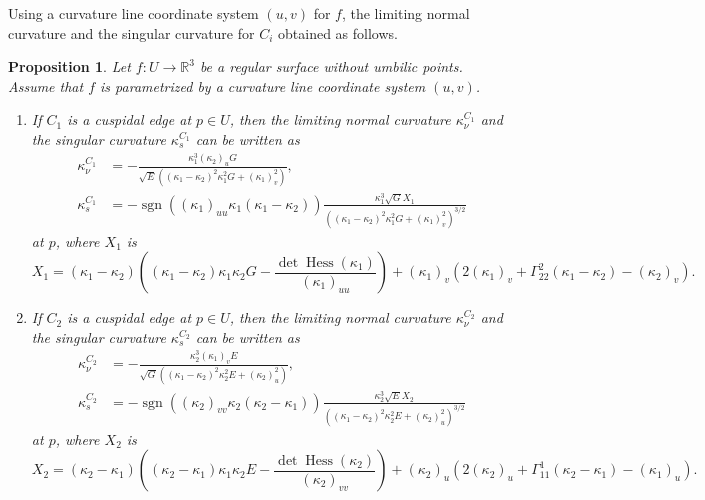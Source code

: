 \documentclass[11pt,a4paper,pdflatex,final]{amsart}
\theoremstyle{plain}
\newtheorem{proposition}[theorem]{Proposition}%
\theoremstyle{definition}
\theoremstyle{remark}
\newcommand{\hess}{\operatorname{Hess}}
\newcommand{\sgn}{\operatorname{sgn}}
\newcommand{\0}{\bm{0}}
\newcommand{\R}{\mathbb{R}}
\numberwithin{equation}{section}
\begin{document}
{
Using a curvature line coordinate system $(u,v)$ for $f$, 
the limiting normal curvature and the singular curvature for $C_i$ 
obtained as follows.
\begin{proposition}\label{prop:curvatures-C}
	Let $f\colon U\to\R^3$ be a regular surface without umbilic points. 
	Assume that $f$ is parametrized by a curvature line coordinate system $(u,v)$. 
	\begin{enumerate}[label={\rm(\arabic*)}]
		\item If $C_1$ is a cuspidal edge at $p\in U$, 
		then the limiting normal curvature $\kappa_\nu^{C_1}$ and 
		the singular curvature $\kappa_s^{C_1}$ can be written as 
		\begin{equation}\label{eq:kskn-C1}
			\begin{aligned}
				\kappa_\nu^{C_1}&=
				-\frac{\kappa_1^3(\kappa_2)_uG}
				{\sqrt{E}((\kappa_1-\kappa_2)^2\kappa_1^2G+(\kappa_1)_v^2)},\\
				\kappa_s^{C_1}&=
				-\sgn((\kappa_1)_{uu}\kappa_1(\kappa_1-\kappa_2))
				\frac{\kappa_1^3\sqrt{G}X_1}
				{((\kappa_1-\kappa_2)^2\kappa_1^2G+(\kappa_1)_v^2)^{3/2}}
			\end{aligned}
		\end{equation}
		at $p$, where $X_1$ is 
		\[
		X_1=(\kappa_1-\kappa_2)\left(
		(\kappa_1-\kappa_2)\kappa_1\kappa_2G-\frac{\det\hess(\kappa_1)}{(\kappa_1)_{uu}}\right)
		+(\kappa_1)_v(2(\kappa_1)_v+\Gamma^{2}_{22}(\kappa_1-\kappa_2)-(\kappa_2)_v).
		\]
		\item If $C_2$ is a cuspidal edge at $p\in U$, 
		then the limiting normal curvature $\kappa_\nu^{C_2}$ and 
		the singular curvature $\kappa_s^{C_2}$ can be written as 
		\begin{equation}\label{eq:kskn-C2}
			\begin{aligned}
				\kappa_\nu^{C_2}&=
				-\frac{\kappa_2^3(\kappa_1)_vE}
				{\sqrt{G}((\kappa_1-\kappa_2)^2\kappa_2^2E+(\kappa_2)_u^2)},\\
				\kappa_s^{C_2}&=
				-\sgn((\kappa_2)_{vv}\kappa_2(\kappa_2-\kappa_1))
				\frac{\kappa_2^3\sqrt{E}X_2}
				{((\kappa_1-\kappa_2)^2\kappa_2^2E+(\kappa_2)_u^2)^{3/2}}
			\end{aligned}
		\end{equation}
		at $p$, where $X_2$ is 
		\[
		X_2=(\kappa_2-\kappa_1)\left(
		(\kappa_2-\kappa_1)\kappa_1\kappa_2E-\frac{\det\hess(\kappa_2)}{(\kappa_2)_{vv}}\right)
		+(\kappa_2)_u(2(\kappa_2)_u+\Gamma^{1}_{11}(\kappa_2-\kappa_1)-(\kappa_1)_u).
		\]
	\end{enumerate}
\end{proposition}
}
\end{document}

